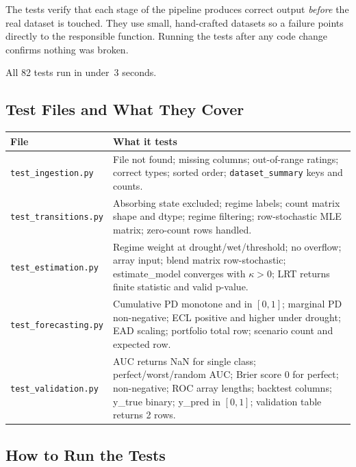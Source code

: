 \documentclass[12pt,a4paper]{article}
\begin{document}
The tests verify that each stage of the pipeline produces correct output
\emph{before} the real dataset is touched.  They use small, hand-crafted
datasets so a failure points directly to the responsible function.  Running
the tests after any code change confirms nothing was broken.

All 82 tests run in under~3 seconds.

\subsection{Test Files and What They Cover}

\begin{center}
\begin{tabular}{lp{9cm}}
  \toprule
  File & What it tests \\
  \midrule
  \texttt{test\_ingestion.py}
    & File not found; missing columns; out-of-range ratings; correct types;
      sorted order; \texttt{dataset\_summary} keys and counts. \\
  \addlinespace
  \texttt{test\_transitions.py}
    & Absorbing state excluded; regime labels; count matrix shape and dtype;
      regime filtering; row-stochastic MLE matrix; zero-count rows handled. \\
  \addlinespace
  \texttt{test\_estimation.py}
    & Regime weight at drought/wet/threshold; no overflow; array input;
      blend matrix row-stochastic; estimate\_model converges with $\kappa > 0$;
      LRT returns finite statistic and valid p-value. \\
  \addlinespace
  \texttt{test\_forecasting.py}
    & Cumulative PD monotone and in $[0,1]$; marginal PD non-negative;
      ECL positive and higher under drought; EAD scaling; portfolio total row;
      scenario count and expected row. \\
  \addlinespace
  \texttt{test\_validation.py}
    & AUC returns NaN for single class; perfect/worst/random AUC;
      Brier score 0 for perfect; non-negative; ROC array lengths;
      backtest columns; y\_true binary; y\_pred in $[0,1]$;
      validation table returns 2 rows. \\
  \bottomrule
\end{tabular}
\end{center}

\subsection{How to Run the Tests}
\end{document}
